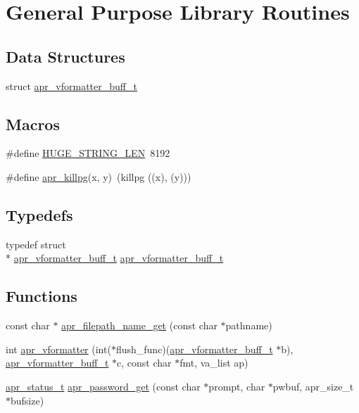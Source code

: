 \hypertarget{group__apr__lib}{\section{General Purpose Library Routines}
\label{group__apr__lib}
}
\subsection*{Data Structures}
\begin{DoxyCompactItemize}
\item 
struct \hyperlink{structapr__vformatter__buff__t}{apr\-\_\-vformatter\-\_\-buff\-\_\-t}
\end{DoxyCompactItemize}
\subsection*{Macros}
\begin{DoxyCompactItemize}
\item 
\#define \hyperlink{group__apr__lib_ga0c9dd98f46b90b5bcd4cbf75e252d0da}{H\-U\-G\-E\-\_\-\-S\-T\-R\-I\-N\-G\-\_\-\-L\-E\-N}~8192
\item 
\#define \hyperlink{group__apr__lib_gaa3b0264aadbd9f8d805252fb1ca1cd0e}{apr\-\_\-killpg}(x, y)~(killpg ((x), (y)))
\end{DoxyCompactItemize}
\subsection*{Typedefs}
\begin{DoxyCompactItemize}
\item 
typedef struct \\*
\hyperlink{structapr__vformatter__buff__t}{apr\-\_\-vformatter\-\_\-buff\-\_\-t} \hyperlink{group__apr__lib_ga5e9986deebda40f2d1cf8364fa03c3c5}{apr\-\_\-vformatter\-\_\-buff\-\_\-t}
\end{DoxyCompactItemize}
\subsection*{Functions}
\begin{DoxyCompactItemize}
\item 
const char $\ast$ \hyperlink{group__apr__lib_ga241e929df23aede34eb3f2651cf56bc9}{apr\-\_\-filepath\-\_\-name\-\_\-get} (const char $\ast$pathname)
\item 
int \hyperlink{group__apr__lib_gad2cd3594aeaafd45931d1034965f48c1}{apr\-\_\-vformatter} (int($\ast$flush\-\_\-func)(\hyperlink{structapr__vformatter__buff__t}{apr\-\_\-vformatter\-\_\-buff\-\_\-t} $\ast$b), \hyperlink{structapr__vformatter__buff__t}{apr\-\_\-vformatter\-\_\-buff\-\_\-t} $\ast$c, const char $\ast$fmt, va\-\_\-list ap)
\item 
\hyperlink{group__apr__errno_gaf76ee4543247e9fb3f3546203e590a6c}{apr\-\_\-status\-\_\-t} \hyperlink{group__apr__lib_ga377e0677598745769ec6f80fecf8f859}{apr\-\_\-password\-\_\-get} (const char $\ast$prompt, char $\ast$pwbuf, apr\-\_\-size\-\_\-t $\ast$bufsize)
\end{DoxyCompactItemize}


